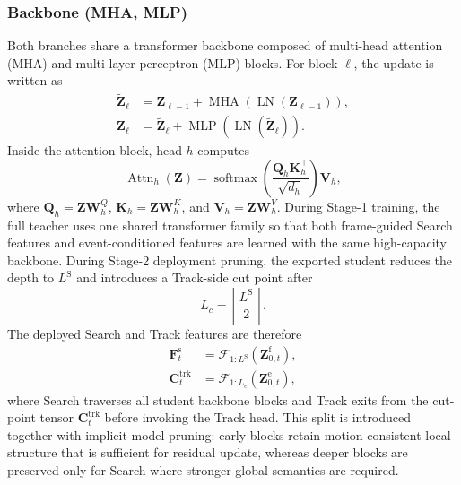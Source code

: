 \documentclass[journal]{IEEEtran}
\begin{document}
\subsubsection{Backbone (MHA, MLP)}
Both branches share a transformer backbone composed of multi-head attention (MHA) and multi-layer perceptron (MLP) blocks. For block $\ell$, the update is written as
\begin{align}
\tilde{\mathbf Z}_{\ell} &= \mathbf Z_{\ell-1} + \operatorname{MHA}\!\left(\operatorname{LN}(\mathbf Z_{\ell-1})\right),
\\
\mathbf Z_{\ell} &= \tilde{\mathbf Z}_{\ell} + \operatorname{MLP}\!\left(\operatorname{LN}(\tilde{\mathbf Z}_{\ell})\right).
\end{align}
Inside the attention block, head $h$ computes
\begin{equation}
\operatorname{Attn}_h(\mathbf Z)=
\operatorname{softmax}\!\left(
\frac{\mathbf Q_h\mathbf K_h^{\top}}{\sqrt{d_h}}
\right)\mathbf V_h,
\end{equation}
where $\mathbf Q_h=\mathbf Z\mathbf W_h^Q$, $\mathbf K_h=\mathbf Z\mathbf W_h^K$, and $\mathbf V_h=\mathbf Z\mathbf W_h^V$. During Stage-1 training, the full teacher uses one shared transformer family so that both frame-guided Search features and event-conditioned features are learned with the same high-capacity backbone. During Stage-2 deployment pruning, the exported student reduces the depth to $L^{\mathrm S}$ and introduces a Track-side cut point after
\begin{equation}
L_c = \left\lfloor \frac{L^{\mathrm S}}{2} \right\rfloor .
\end{equation}
The deployed Search and Track features are therefore
\begin{align}
\mathbf F_t^{\mathrm{s}} &= \mathcal F_{1:L^{\mathrm S}}\!\left(\mathbf Z_{0,t}^{\mathrm{f}}\right),
\\
\mathbf C_t^{\mathrm{trk}} &= \mathcal F_{1:L_c}\!\left(\mathbf Z_{0,t}^{\mathrm{e}}\right),
\end{align}
where Search traverses all student backbone blocks and Track exits from the cut-point tensor $\mathbf C_t^{\mathrm{trk}}$ before invoking the Track head. This split is introduced together with implicit model pruning: early blocks retain motion-consistent local structure that is sufficient for residual update, whereas deeper blocks are preserved only for Search where stronger global semantics are required.
\end{document}
